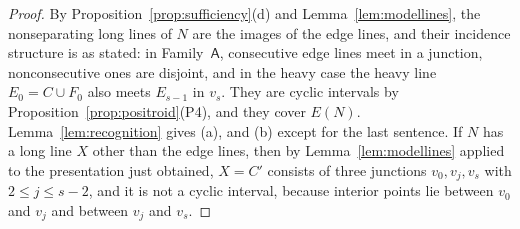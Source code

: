 \documentclass[11pt]{amsart}
\theoremstyle{definition}
\theoremstyle{remark}
\numberwithin{equation}{section}
\newcommand{\FA}{\mathsf{A}}
\begin{document}
\begin{proof}
By Proposition~\ref{prop:sufficiency}(d) and Lemma~\ref{lem:modellines}, the nonseparating long lines of $N$ are the images of the edge lines, and their incidence structure is as stated: in Family~$\FA$, consecutive edge lines meet in a junction, nonconsecutive ones are disjoint, and in the heavy case the heavy line $E_0=C\cup F_0$ also meets $E_{s-1}$ in $v_s$. They are cyclic intervals by Proposition~\ref{prop:positroid}(P4), and they cover $E(N)$. Lemma~\ref{lem:recognition} gives (a), and (b) except for the last sentence. If $N$ has a long line $X$ other than the edge lines, then by Lemma~\ref{lem:modellines} applied to the presentation just obtained, $X=C'$ consists of three junctions $v_0,v_j,v_s$ with $2\le j\le s-2$, and it is not a cyclic interval, because interior points lie between $v_0$ and $v_j$ and between $v_j$ and $v_s$.


\end{proof}
\end{document}
